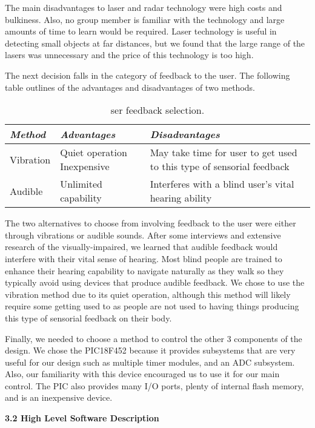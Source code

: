 The main disadvantages to laser and radar technology were high costs and
bulkiness. Also, no group member is familiar with the technology and
large amounts of time to learn would be required. Laser technology is
useful in detecting small objects at far distances, but we found that
the large range of the lasers was unnecessary and the price of this
technology is too high.

The next decision falls in the category of feedback to the user. The
following table outlines of the advantages and disadvantages of two
methods.

\begin{table}
\caption{ser feedback selection.}
\label{table:<context>}
\begin{tabular}{|m{3cm}|m{3cm}|m{3cm}|} \hline
\emph{\textbf{Method}} & \emph{\textbf{Advantages}} & \emph{\textbf{Disadvantages}} \\ \hline
Vibration & Quiet operation Inexpensive & May take time for user to get used to this type of
sensorial feedback \\ \hline
Audible & Unlimited capability & Interferes with a blind user's vital
hearing ability \\ \hline
\end{tabular}
\end{table}

The two alternatives to choose from involving feedback to the user were
either through vibrations or audible sounds. After some interviews and
extensive research of the visually-impaired, we learned that audible
feedback would interfere with their vital sense of hearing. Most blind
people are trained to enhance their hearing capability to navigate
naturally as they walk so they typically avoid using devices that
produce audible feedback. We chose to use the vibration method due to
its quiet operation, although this method will likely require some
getting used to as people are not used to having things producing this
type of sensorial feedback on their body.

Finally, we needed to choose a method to control the other 3 components
of the design. We chose the PIC18F452 because it provides subsystems
that are very useful for our design such as multiple timer modules, and
an ADC subsystem. Also, our familiarity with this device encouraged us
to use it for our main control. The PIC also provides many I/O ports,
plenty of internal flash memory, and is an inexpensive device.


 \textbf{3.2 High Level Software Description}

